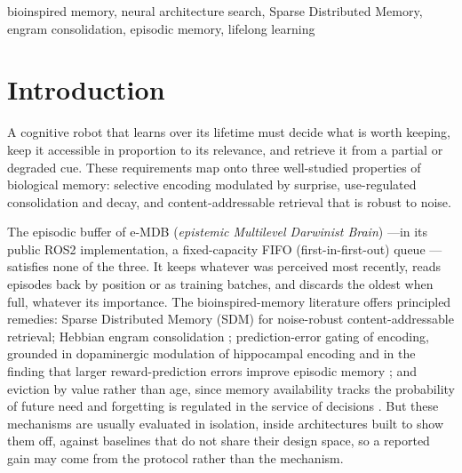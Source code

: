 \documentclass[conference]{IEEEtran}
\begin{document}
\begin{IEEEkeywords}
bioinspired memory, neural architecture search, Sparse Distributed Memory,
engram consolidation, episodic memory, lifelong learning
\end{IEEEkeywords}

\section{Introduction}

A cognitive robot that learns over its lifetime must decide what is worth
keeping, keep it accessible in proportion to its relevance, and retrieve it from
a partial or degraded cue. These requirements map onto three well-studied
properties of biological memory: selective encoding modulated by surprise,
use-regulated consolidation and decay, and content-addressable retrieval that
is robust to noise.

The episodic buffer of e-MDB (\emph{epistemic Multilevel Darwinist Brain})
\cite{romero2022thesis,romero2023ica} ---in its public ROS2 implementation, a
fixed-capacity FIFO (first-in-first-out) queue \cite{emdbnodes}--- satisfies
none of the three. It keeps whatever was perceived most recently, reads
episodes back by position or as training batches, and discards the oldest when
full, whatever its importance. The bioinspired-memory literature offers
principled remedies: Sparse Distributed Memory (SDM) \cite{kanerva1988} for
noise-robust content-addressable retrieval; Hebbian engram consolidation
\cite{liu2012,hebb1949}; prediction-error gating of encoding, grounded in
dopaminergic modulation of hippocampal encoding \cite{lisman2005,shohamy2010}
and in the finding that larger reward-prediction errors improve episodic
memory \cite{rouhani2018}; and eviction by value rather than age, since memory
availability tracks the probability of future need \cite{anderson1991} and
forgetting is regulated in the service of decisions \cite{richards2017}. But
these mechanisms are usually evaluated in isolation, inside architectures built
to show them off, against baselines that do not share their design space, so a
reported gain may come from the protocol rather than the mechanism.
\end{document}
